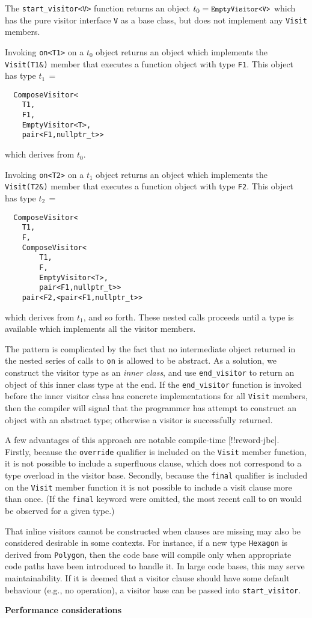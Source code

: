 \documentclass[10pt,a4paper,twocolumn]{article}
\renewcommand\section[1]{
    \begin{minipage}[c]{0.94\linewidth}
    \large \raggedright \sffamily \textbf{#1}
    \end{minipage}
}
\newcommand\mycode[1]{{\small\texttt{#1}}}
\begin{document}
The \mycode{start\_visitor<V>} function returns an object $t_0 = \mbox{\mycode{EmptyVisitor<V>}}$ which has the pure visitor interface \mycode{V} as a base class, but does not implement any \mycode{Visit} members.

Invoking \mycode{on<T1>} on a $t_0$ object returns an object which implements the \mycode{Visit(T1\&)} member that executes a function object with type \mycode{F1}. This object has type $t_1\, =$
{\small\begin{verbatim}
  ComposeVisitor<
    T1,
    F1,
    EmptyVisitor<T>,
    pair<F1,nullptr_t>>
\end{verbatim}}
which derives from $t_0$.

Invoking \mycode{on<T2>} on a $t_1$ object returns an object which implements the \mycode{Visit(T2\&)} member that executes a function object with type \mycode{F2}. This object has type $t_2\, =$
{\small\begin{verbatim}
  ComposeVisitor<
    T1,
    F,
    ComposeVisitor<
        T1,
        F,
        EmptyVisitor<T>,
        pair<F1,nullptr_t>>
    pair<F2,<pair<F1,nullptr_t>>
\end{verbatim}}
which derives from $t_1$, and so forth. These nested calls proceeds until a type is available which implements all the visitor members.

The pattern is complicated by the fact that no intermediate object returned in the nested series of calls to \mycode{on} is allowed to be abstract. As a solution, we construct the visitor type as an \emph{inner class}, and use \mycode{end\_visitor} to return an object of this inner class type at the end. If the \mycode{end\_visitor} function is invoked before the inner visitor class has concrete implementations for all \mycode{Visit} members, then the compiler will signal that the programmer has attempt to construct an object with an abstract type; otherwise a visitor is successfully returned.

A few advantages of this approach are notable compile-time [!!reword-jbc]. Firstly, because the \mycode{override} qualifier is included on the \mycode{Visit} member function, it is not possible to include a superfluous clause, which does not correspond to a type overload in the visitor base. Secondly, because the \mycode{final} qualifier is included on the \mycode{Visit} member function it is not possible to include a visit clause more than once. (If the \mycode{final} keyword were omitted, the most recent call to \mycode{on} would be observed for a given type.)

That inline visitors cannot be constructed when clauses are missing may also be considered desirable in some contexts. For instance, if a new type \mycode{Hexagon} is derived from \mycode{Polygon}, then the code base will compile only when appropriate code paths have been introduced to handle it. In large code bases, this may serve maintainability. If it is deemed that a visitor clause should have some default behaviour (e.g., no operation), a visitor base can be passed into \mycode{start\_visitor}.

\section{Performance considerations}
\end{document}
